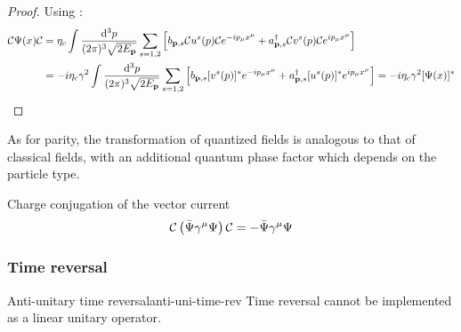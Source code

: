 \begin{proofbox}
  \begin{proof}
    Using :
    \begin{equation*}
      \begin{split}
        \mathcal{C} \Psi(x) \mathcal{C}
        &= \eta_c \int \frac{\mathrm{d}^3p}{(2\pi)^3 \sqrt{2E_{\mathbf{p}}}} \sum_{s = 1,2} \left[ b_{\mathbf{p},s} \mathcal{C} u^s(p) \mathcal{C} e^{-i p_\mu x^\mu} + a_{\mathbf{p},s}^\dagger \mathcal{C} v^s(p) \mathcal{C} e^{i p_\mu x^\mu} \right] \\
        &= -i \eta_c \gamma^2 \int \frac{\mathrm{d}^3p}{(2\pi)^3 \sqrt{2E_{\mathbf{p}}}} \sum_{s = 1,2} \left[ b_{\mathbf{p},s} [v^s(p)]^* e^{-i p_\mu x^\mu} + a_{\mathbf{p},s}^\dagger [u^s(p)]^* e^{i p_\mu x^\mu} \right] = -i \eta_c \gamma^2 [\Psi(x)]^*
      \end{split}
    \end{equation*}
  \end{proof}
\end{proofbox}

As for parity, the transformation of quantized fields is analogous to that of classical fields, with an additional quantum phase factor which depends on the particle type.

\begin{proposition}[before upper = {\tcbtitle}]{Charge conjugation of the vector current}{}
  \begin{equation}
    \mathcal{C} \left( \bar{\Psi} \gamma^\mu \Psi \right) \mathcal{C} = - \bar{\Psi} \gamma^\mu \Psi
    \label{eq:charge-conj-fermion-curr}
  \end{equation}
\end{proposition}

\subsubsection{Time reversal}

\begin{theorem}{Anti-unitary time reversal}{anti-uni-time-rev}
  Time reversal cannot be implemented as a linear unitary operator.
\end{theorem}

